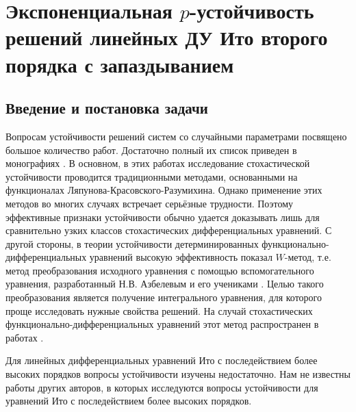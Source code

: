 

\chapter{Экспоненциальная $p$-устойчивость решений линейных ДУ Ито второго порядка с запаздыванием}




\section{Введение и постановка задачи}

Вопросам устойчивости решений систем со случайными параметрами посвящено большое количество работ.
Достаточно полный их список приведен в монографиях \cite{kri-bib-1, kri-bib-2, kri-bib-3, kri-bib-4}.
В основном, в этих работах исследование стохастической устойчивости проводится традиционными методами, основанными на функционалах Ляпунова-Красовского-Разумихина.
Однако применение этих методов во многих случаях встречает серьёзные трудности.
Поэтому эффективные признаки устойчивости обычно удается доказывать лишь для сравнительно узких классов стохастических дифференциальных уравнений.
С другой стороны, в теории устойчивости детерминированных функционально-дифференциальных уравнений высокую эффективность показал  $W$-метод, т.е. метод преобразования исходного уравнения с помощью вспомогательного уравнения, разработанный Н.В. Азбелевым и его учениками \cite{kri-bib-5, kri-bib-6, kri-bib-7, kri-bib-8}.
Целью такого преобразования является получение интегрального уравнения, для которого проще исследовать нужные свойства решений.
На случай стохастических функционально-дифференциальных уравнений этот метод распространен в работах \cite{kri-bib-9, kri-bib-10, kri-bib-11, kri-bib-12, kri-bib-13, kri-bib-14, kri-bib-15}.

Для линейных дифференциальных уравнений Ито с последействием более высоких порядков вопросы устойчивости изучены недостаточно.
Нам не известны работы других авторов, в которых исследуются вопросы устойчивости для уравнений Ито с последействием более высоких порядков.

